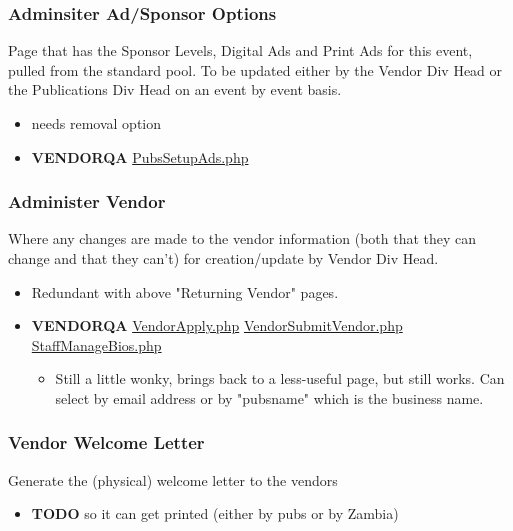 \documentclass[captions=tablesignature]{scrartcl}
\begin{document}
\subsubsection{Adminsiter Ad/Sponsor Options}
\label{sec-3-1-14}
Page that has the Sponsor Levels, Digital Ads and Print Ads for
this event, pulled from the standard pool.  To be updated either
by the Vendor Div Head or the Publications Div Head on an event by
event basis.
\begin{itemize}
\item needs removal option
\end{itemize}
\begin{itemize}
\item {\bfseries\sffamily VENDORQA} \href{../webpages/PubsSetupAds.php}{PubsSetupAds.php}
\label{sec-3-1-14-1}
\end{itemize}

\subsubsection{Administer Vendor}
\label{sec-3-1-15}
Where any changes are made to the vendor information (both that
they can change and that they can't) for creation/update by Vendor
Div Head.
\begin{itemize}
\item Redundant with above "Returning Vendor" pages.
\end{itemize}
\begin{itemize}
\item {\bfseries\sffamily VENDORQA} \href{../webpages/VendorApply.php}{VendorApply.php} \href{../webpages/VendorSubmitVendor.php}{VendorSubmitVendor.php} \href{../webpages/StaffManageBios.php}{StaffManageBios.php}
\label{sec-3-1-15-1}
\begin{itemize}
\item Still a little wonky, brings back to a less-useful page, but
still works.  Can select by email address or by "pubsname"
which is the business name.
\end{itemize}
\end{itemize}

\subsubsection{Vendor Welcome Letter}
\label{sec-3-1-16}
Generate the (physical) welcome letter to the vendors
\begin{itemize}
\item {\bfseries\sffamily TODO} so it can get printed (either by pubs or by Zambia)
\label{sec-3-1-16-1}
\end{itemize}
\end{document}
